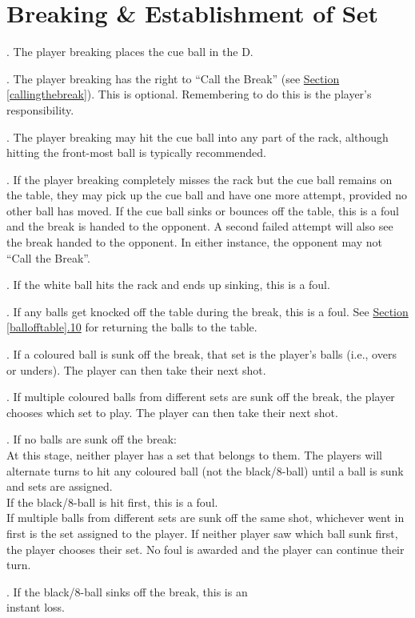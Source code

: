 \documentclass[a4paper, twocolumn]{article}
\newcommand{\fixedlabel}[1]{\textbf{\makebox[3.5em][l]{#1}}}
\newcommand{\itemspace}{\vspace{1.2mm}\\}
\begin{document}
\section{Breaking \& Establishment of Set} \label{breaking}
\ex. The player breaking places the cue ball in the D.\par
\ex. The player breaking has the right to “Call the Break” (see \hyperref[callingthebreak]{Section \ref*{callingthebreak}}). This is optional. Remembering to do this is the player's responsibility.\par
\ex. \label{breakingballs}The player breaking may hit the cue ball into any part of the rack, although hitting the front-most ball is typically recommended.\par
\ex. If the player breaking completely misses the rack but the cue ball remains on the table, they may pick up the cue ball and have one more attempt, provided no other ball has moved. If the cue ball sinks or bounces off the table, this is a foul and the break is handed to the opponent. A second failed attempt will also see the break handed to the opponent. In either instance, the opponent may not “Call the Break”.\par
\ex. If the white ball hits the rack and ends up sinking, this is a foul.\par
\ex. If any balls get knocked off the table during the break, this is a foul. See \hyperref[ballofftable]{Section \ref*{ballofftable}.10} for returning the balls to the table.\par
\ex. If a coloured ball is sunk off the break, that set is the player's balls (i.e., overs or unders). The player can then take their next shot.\par
\ex. If multiple coloured balls from different sets are sunk off the break, the player chooses which set to play. The player can then take their next shot.\par
\ex. \label{breakingnoballs}If no balls are sunk off the break:\itemspace
\fixedlabel{3.9.1}At this stage, neither player has a set that belongs to them. The players will alternate turns to hit any coloured ball (not the black/8-ball) until a ball is sunk and sets are assigned.\itemspace
\fixedlabel{3.9.2}If the black/8-ball is hit first, this is a foul.\itemspace
\fixedlabel{3.9.3}If multiple balls from different sets are sunk off the same shot, whichever went in first is the set assigned to the player. If neither player saw which ball sunk first, the player chooses their set. No foul is awarded and the player can continue their turn.
\par
\ex. \hspace{-2.6mm} If the black/8-ball sinks off the break, this is an \\ \phantom{} \hspace{-2.5mm}instant loss.\par
\end{document}
